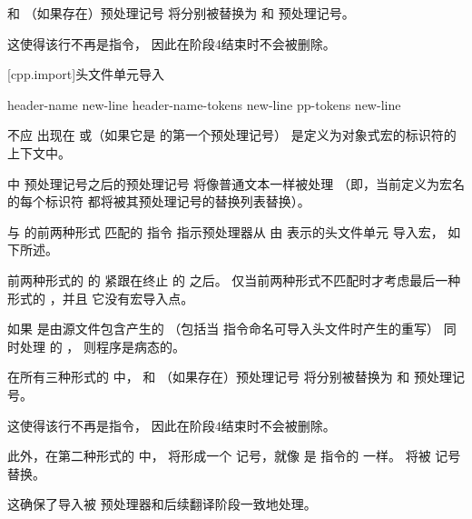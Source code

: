     \pnum
     和 （如果存在）预处理记号
    将分别被替换为  和
     预处理记号。
    \begin{note}
    这使得该行不再是指令，
    因此在阶段4结束时不会被删除。
    \end{note}
    
    [cpp.import]{头文件单元导入}
    
    \begin{bnf}
    \br
          header-name  \terminal{;} new-line\br
          header-name-tokens  \terminal{;} new-line\br
          pp-tokens \terminal{;} new-line
    \end{bnf}
    
    \pnum
     不应
    出现在 
    或（如果它是  的第一个预处理记号）
    是定义为对象式宏的标识符的上下文中。
    
    \pnum
      中  预处理记号之后的预处理记号
    将像普通文本一样被处理
    （即，当前定义为宏名的每个标识符
    都将被其预处理记号的替换列表替换）。
    \begin{note}
    与  的前两种形式
    匹配的  指令
    指示预处理器从
    由  表示的头文件单元
    导入宏，
    如下所述。
    \end{note}
    前两种形式的  的 
    紧跟在终止  的  之后。
    仅当前两种形式不匹配时才考虑最后一种形式的 ，并且
    它没有宏导入点。
    
    \pnum
    如果  是由源文件包含产生的
    （包括当  指令命名可导入头文件时产生的重写）
    同时处理  的 ，
    则程序是病态的。
    
    \pnum
    在所有三种形式的  中，
     和 （如果存在）预处理记号
    将分别被替换为  和
     预处理记号。
    \begin{note}
    这使得该行不再是指令，
    因此在阶段4结束时不会被删除。
    \end{note}
    此外，在第二种形式的  中，
    将形成一个  记号，就像
    是  指令的  一样。
     将被
     记号替换。
    \begin{note}
    这确保了导入被
    预处理器和后续翻译阶段一致地处理。
    \end{note}
    
